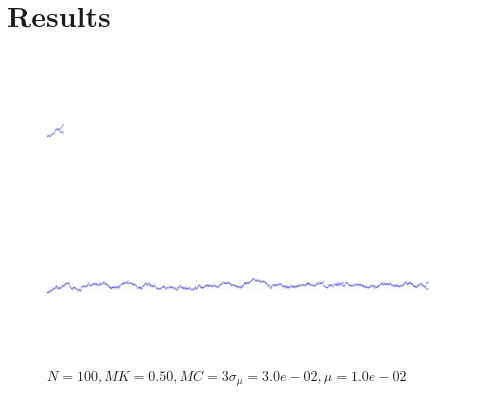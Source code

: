 \documentclass[authoryear,review,11pt]{elsarticle}
\begin{document}
\section{Results}
\begin{figure}
\begin{center}
\includegraphics[height= 4cm, width=\textwidth]{images/short.jpg}

\includegraphics[height=4cm, width=\textwidth]{images/long.jpg}
\end{center}
\caption{$N = 100, MK = 0.50, MC= 3 \sigma_{\mu} = 3.0e-02, \mu = 1.0e-02$}
\label{fig:times}
\end{figure}


\end{document}

